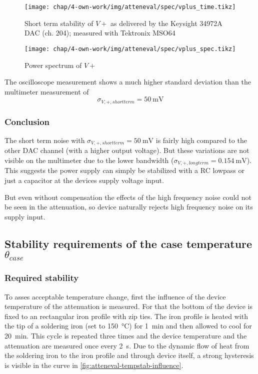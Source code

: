 \begin{figure}[tb]
	\centering
	\texttt{[image: chap/4-own-work/img/atteneval/spec/vplus\_time.tikz]}
	\caption{Short term stability of $V+$ as delivered by the Keysight 34972A DAC (ch. 204); measured with Tektronix MSO64}
	\label{fig:atteneval-vsuppstab-shorttermTime}
\end{figure}

\begin{figure}[tb]
	\centering
	\texttt{[image: chap/4-own-work/img/atteneval/spec/vplus\_spec.tikz]}
	\caption{Power spectrum of $V+$}
	\label{fig:atteneval-vsuppstab-shorttermSpec}
\end{figure}

The oscilloscope measurement shows a much higher standard deviation than the multimeter measurement of
\begin{equation}
\sigma_{V,+,shortterm} = \SI{50}{\milli\volt}
\end{equation}

\FloatBarrier
\subsubsection{Conclusion}
The short term noise with $\sigma_{V,+,shortterm} = \SI{50}{\milli\volt}$ is fairly high compared to the other DAC channel (with a higher output voltage). But these variations are not visible on the multimeter due to the lower bandwidth ($\sigma_{V,+,longterm} = \SI{0.154}{\milli\volt}$). This suggests the power supply can simply be stabilized with a RC lowpass or just a capacitor at the devices supply voltage input.

But even without compensation the effects of the high frequency noise could not be seen in the attenuation, so device naturally rejects high frequency noise on its supply input.

\FloatBarrier
\subsection{Stability requirements of the case temperature $\theta_{case}$}
\subsubsection{Required stability}
To asses acceptable temperature change, first the influence of the device temperature of the attenuation is measured. For that the bottom of the device is fixed to an rectangular iron profile with zip ties. The iron profile is heated with the tip of a soldering iron (set to \SI{150}{\degreeCelsius}) for \SI{1}{\minute} and then allowed to cool for \SI{20}{\minute}. This cycle is repeated three times and the device temperature and the attenuation are measured once every \SI{2}{\second}. Due to the dynamic flow of heat from the soldering iron to the iron profile and through device itself, a strong hysteresis is visible in the curve in \autoref{fig:atteneval-tempstab-influence}. 

